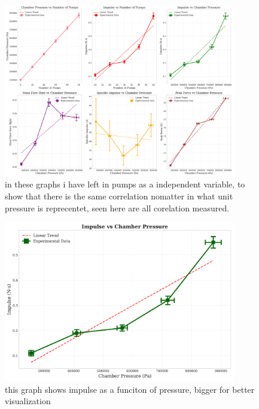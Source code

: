 \documentclass[12pt,a4paper]{article}
\begin{document}
\begin{figure}[H]
\centering
\includegraphics[width=0.9\textwidth]{physics_ia_comprehensive_analysis.pdf}
 \caption{in these graphs i have left in pumps as a independent variable, to show that there is the same correlation nomatter in what unit pressure is reprecentet, seen here are all corelation measured.}
\label{fig:comprehensive_analysis}
\end{figure}

\begin{figure}[H]
\centering
\includegraphics[width=0.9\textwidth]{impulse_vs_pressure.pdf}
    \caption{this graph shows impulse as a funciton of pressure, bigger for better visualization}
\label{fig:impulse_pressure}
\end{figure}
\end{document}
